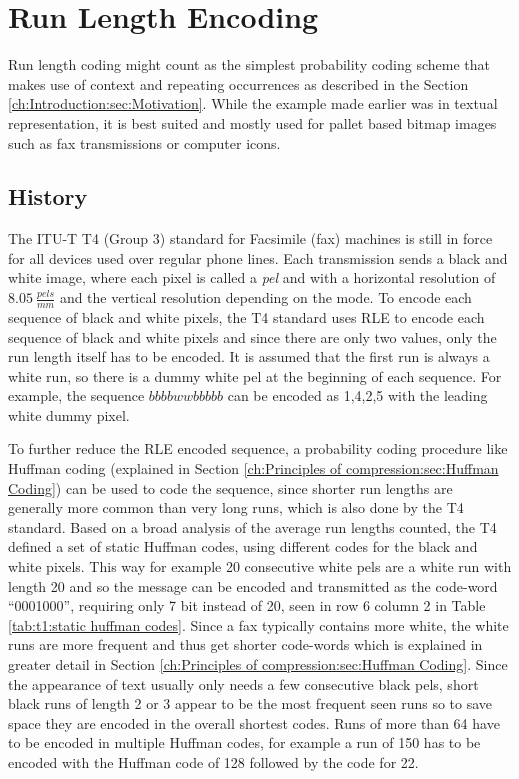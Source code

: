 \section{Run Length Encoding}
\label{ch:Principles of compression:sec:Run Length Encoding}
\par{
	Run length coding might count as the simplest probability coding scheme that makes use of context and repeating occurrences as described in the Section \ref{ch:Introduction:sec:Motivation}. While the example made earlier was in textual representation, it is best suited and mostly used for pallet based bitmap images \cite{palette-image} such as fax transmissions or computer icons.
}

\subsection{History}
\label{ch:Principles of compression:sec:Run Length Encoding:subSec:History}
\par{
 The ITU-T T4 (Group 3) standard for Facsimile (fax) machines \cite{ITU} is still in force for all devices used over regular phone lines. Each transmission sends a black and white image, where each pixel is called a \textit{pel} and with a horizontal resolution of $8.05 \: \frac{pels}{mm}$ and the vertical resolution depending on the mode. To encode each sequence of black and white pixels, the T4 standard uses RLE to encode each sequence of black and white pixels and since there are only two values, only the run length itself has to be encoded. It is assumed that the first run is always a white run, so there is a dummy white pel at the beginning of each sequence. For example, the sequence $bbbbwwbbbbb$ can be encoded as 1,4,2,5 with the leading white dummy pixel.
}
\par{
To further reduce the RLE encoded sequence, a probability coding procedure like Huffman coding (explained in Section \ref{ch:Principles of compression:sec:Huffman Coding}) can be used to code the sequence, since shorter run lengths are generally more common than very long runs, which is also done by the T4 standard. Based on a broad analysis of the average run lengths counted, the T4 defined a set of static Huffman codes, using different codes for the black and white pixels. This way for example 20 consecutive white pels  are a white run with length 20 and so the message can be encoded and transmitted as the code-word \enquote{0001000}, requiring only 7 bit instead of 20, seen in row 6 column 2 in Table \ref{tab:t1:static huffman codes}. Since a fax typically contains more white, the white runs are more frequent and thus get shorter code-words which is explained in greater detail in Section \ref{ch:Principles of compression:sec:Huffman Coding}. Since the appearance of text usually only needs a few consecutive black pels, short black runs of length 2 or 3 appear to be the most frequent seen runs so to save space they are encoded in the overall shortest codes. Runs of more than 64 have to be encoded in multiple Huffman codes, for example a run of 150 has to be encoded with the Huffman code of 128 followed by the code for 22.
}
